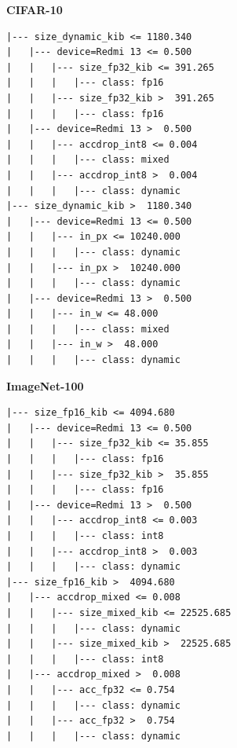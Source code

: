 \begin{table}[!htbp]
\centering
\caption{Depth-3 decision trees (fitted on all pairs; feature names as in
\texttt{predictor.py}; sizes in KiB, accuracy drops as fractions). Cross-validated
performance with feasibility masking, by depth: CIFAR-10 2: 62.4\%/8.7\%, 3: 65.0\%/8.1\%, 4: 64.4\%/9.1\%, 6: 65.9\%/8.1\%; ImageNet-100 2: 48.4\%/4.3\%, 3: 51.5\%/3.2\%, 4: 51.7\%/3.1\%, 6: 55.1\%/2.6\% (exact / geo.\ regret). Size-band look-up rule (device $\times$ FP32 size band, CV): CIFAR-10 58.7\%/10.2\%, ImageNet-100 48.4\%/3.8\%.}
\label{tab:trees}
\scriptsize
\begin{minipage}[t]{0.48\linewidth}
\textbf{CIFAR-10}
\begin{verbatim}
|--- size_dynamic_kib <= 1180.340
|   |--- device=Redmi 13 <= 0.500
|   |   |--- size_fp32_kib <= 391.265
|   |   |   |--- class: fp16
|   |   |--- size_fp32_kib >  391.265
|   |   |   |--- class: fp16
|   |--- device=Redmi 13 >  0.500
|   |   |--- accdrop_int8 <= 0.004
|   |   |   |--- class: mixed
|   |   |--- accdrop_int8 >  0.004
|   |   |   |--- class: dynamic
|--- size_dynamic_kib >  1180.340
|   |--- device=Redmi 13 <= 0.500
|   |   |--- in_px <= 10240.000
|   |   |   |--- class: dynamic
|   |   |--- in_px >  10240.000
|   |   |   |--- class: dynamic
|   |--- device=Redmi 13 >  0.500
|   |   |--- in_w <= 48.000
|   |   |   |--- class: mixed
|   |   |--- in_w >  48.000
|   |   |   |--- class: dynamic
\end{verbatim}
\end{minipage}\hfill
\begin{minipage}[t]{0.48\linewidth}
\textbf{ImageNet-100}
\begin{verbatim}
|--- size_fp16_kib <= 4094.680
|   |--- device=Redmi 13 <= 0.500
|   |   |--- size_fp32_kib <= 35.855
|   |   |   |--- class: fp16
|   |   |--- size_fp32_kib >  35.855
|   |   |   |--- class: fp16
|   |--- device=Redmi 13 >  0.500
|   |   |--- accdrop_int8 <= 0.003
|   |   |   |--- class: int8
|   |   |--- accdrop_int8 >  0.003
|   |   |   |--- class: dynamic
|--- size_fp16_kib >  4094.680
|   |--- accdrop_mixed <= 0.008
|   |   |--- size_mixed_kib <= 22525.685
|   |   |   |--- class: dynamic
|   |   |--- size_mixed_kib >  22525.685
|   |   |   |--- class: int8
|   |--- accdrop_mixed >  0.008
|   |   |--- acc_fp32 <= 0.754
|   |   |   |--- class: dynamic
|   |   |--- acc_fp32 >  0.754
|   |   |   |--- class: dynamic
\end{verbatim}
\end{minipage}
\end{table}